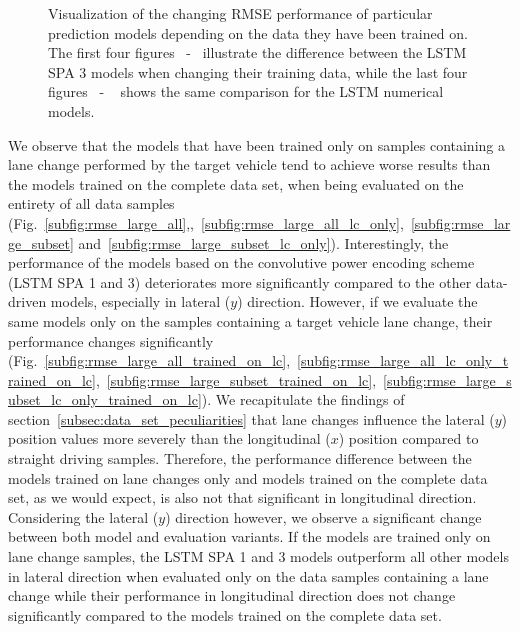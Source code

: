 \begin{figure}[t!]
{    }
    \caption{Visualization of the changing \ac{RMSE} performance of particular prediction models depending on the data they have been trained on.
        The first four figures~\protect{} -~\protect{} illustrate the difference between the \ac{LSTM} \acs{SPA} \num{3} models when changing their training data, while the last four figures~\protect{} -
        ~\protect{} shows the same comparison for the \ac{LSTM} numerical models.
    }
    \label{fig:rmse_on_board_training_all_vs_training_on_lc_only}
\end{figure}

We observe that the models that have been trained only on samples containing a lane change performed by the target vehicle tend to achieve worse results than the models trained on the complete data set, when being evaluated on the entirety of all data samples (Fig.~\ref{subfig:rmse_large_all},,~\ref{subfig:rmse_large_all_lc_only},~\ref{subfig:rmse_large_subset} and~\ref{subfig:rmse_large_subset_lc_only}).
Interestingly, the performance of the models based on the convolutive power encoding scheme (\acs{LSTM} \acs{SPA} \num{1} and \num{3}) deteriorates more significantly compared to the other data-driven models, especially in lateral ($y$) direction.
However, if we evaluate the same models only on the samples containing a target vehicle lane change, their performance changes significantly (Fig.~\ref{subfig:rmse_large_all_trained_on_lc},~\ref{subfig:rmse_large_all_lc_only_trained_on_lc},~\ref{subfig:rmse_large_subset_trained_on_lc},~\ref{subfig:rmse_large_subset_lc_only_trained_on_lc}).
We recapitulate the findings of section~\ref{subsec:data_set_peculiarities} that lane changes influence the lateral ($y$) position values more severely than the longitudinal ($x$) position compared to straight driving samples.
Therefore, the performance difference between the models trained on lane changes only and models trained on the complete data set, as we would expect, is also not that significant in longitudinal direction.
Considering the lateral ($y$) direction however, we observe a significant change between both model and evaluation variants.
If the models are trained only on lane change samples, the \ac{LSTM} \acs{SPA} \num{1} and \num{3} models outperform all other models in lateral direction when evaluated only on the data samples containing a lane change while their performance in longitudinal direction does not change significantly compared to the models trained on the complete data set.

